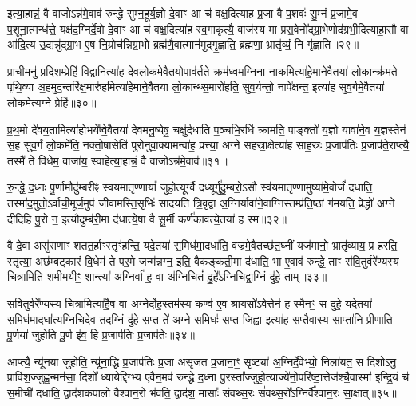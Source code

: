 इत्या॒हान्नं॒ वै वाजो\-ऽन्न॑मे॒वाव॑ रुन्द्धे सुम्न॒हूर्य॒ज्ञो दे॒वाꣳ आ च॑ वक्ष॒दित्या॑ह प्र॒जा वै प॒शवः॑ सु॒म्नं प्र॒जामे॒व प॒शूना॒त्मन्ध॑त्ते॒ यक्ष॑द॒ग्निर्दे॒वो दे॒वाꣳ आ च॑ वक्ष॒दित्या॑ह स्व॒गाकृ॑त्यै॒ वाज॑स्य मा प्रस॒वेनो᳚द्ग्रा॒भेणोद॑ग्रभी॒दित्या॑हा॒सौ वा आ॑दि॒त्य उ॒द्यन्नु॑द्ग्रा॒भ ए॒ष नि॒म्रोच॑न्निग्रा॒भो ब्रह्म॑णै॒वात्मान॑मुद्गृ॒ह्णाति॒ ब्रह्म॑णा॒ भ्रातृ॑व्यं॒ नि गृ॑ह्णाति॥२९॥

{\anuvakamend[{प्रा॒णैः पोषो᳚\-ऽप्र॒त्याग्नी᳚ध्रे॒ पति॑मे॒ष दश॑ च॥६॥}]}

प्राची॒मनु॑ प्र॒दिश॒म्प्रेहि॑ वि॒द्वानित्या॑ह देवलो॒कमे॒वैतयो॒पाव॑र्तते॒ क्रम॑ध्वम॒ग्निना॒ नाक॒मित्या॑हे॒माने॒वैतया॑ लो॒कान्क्र॑मते पृथि॒व्या अ॒हमुद॒न्तरि॑क्ष॒मारु॑ह॒मित्या॑हे॒माने॒वैतया॑ लो॒कान्थ्स॒मारो॑हति॒ सुव॒र्यन्तो॒ नापे᳚क्षन्त॒ इत्या॑ह सुव॒र्गमे॒वैतया॑ लो॒कमे॒त्यग्ने॒ प्रेहि॑॥३०॥

प्र॒थ॒मो दे॑वय॒तामित्या॑हो॒भये᳚ष्वे॒वैतया॑ देवमनु॒ष्येषु॒ चक्षु॑र्दधाति प॒ञ्चभि॒रधि॑ क्रामति॒ पाङ्क्तो॑ य॒ज्ञो यावा॑ने॒व य॒ज्ञस्तेन॑ स॒ह सु॑व॒र्गं लो॒कमे॑ति॒ नक्तो॒षासेति॑ पुरोनुवा॒क्या॑मन्वा॑ह॒ प्रत्त्या॒ अग्ने॑ सहस्रा॒क्षेत्या॑ह साह॒स्रः प्र॒जाप॑तिः प्र॒जाप॑ते॒राप्त्यै॒ तस्मै॑ ते विधेम॒ वाजा॑य॒ स्वाहेत्या॒हान्नं॒ वै वाजो\-ऽन्न॑मे॒वाव॑॥३१॥

रु॒न्द्धे॒ द॒ध्नः पू॒र्णामौदु॑म्बरीꣴ स्वयमातृ॒ण्णायां᳚ जुहो॒त्यूर्ग्वै दध्यूर्गु॑दु॒म्बरो॒\-ऽसौ स्व॑यमातृ॒ण्णामुष्या॑मे॒वोर्जं॑ दधाति॒ तस्मा॑द॒मुतो॒\-ऽर्वाची॒मूर्ज॒मुप॑ जीवामस्ति॒सृभिः॑ सादयति त्रि॒वृद्वा अ॒ग्निर्यावा॑ने॒वाग्निस्तम्प्र॑ति॒ष्ठां ग॑मयति॒ प्रेद्धो॑ अग्ने दीदिहि पु॒रो न॒ इत्यौदुम्ब॑री॒मा द॑धात्ये॒षा वै सू॒र्मी कर्ण॑कावत्ये॒तया॑ ह स्म॥३२॥

वै दे॒वा असु॑राणाꣳ शतत॒र्\mbox{}हाꣳस्तृꣳ॑हन्ति॒ यदे॒तया॑ स॒मिध॑मा॒दधा॑ति॒ वज्र॑मे॒वैतच्छ॑त॒घ्नीं यज॑मानो॒ भ्रातृ॑व्याय॒ प्र ह॑रति॒ स्तृत्या॒ अछ॑म्बट्कारं वि॒धेम॑ ते पर॒मे जन्म॑न्नग्न॒ इति॒ वैक॑ङ्कती॒मा द॑धाति॒ भा ए॒वाव॑ रुन्द्धे॒ ताꣳ स॑वि॒तुर्वरे᳚ण्यस्य चि॒त्रामिति॑ शमी॒मयी॒ꣳ॒ शान्त्या॑ अ॒ग्निर्वा॑ ह॒ वा अ॑ग्नि॒चितं॑ दु॒हे᳚\-ऽग्नि॒चिद्वा॒ग्निं दु॑हे॒ ताम्॥३३॥

स॒वि॒तुर्वरे᳚ण्यस्य चि॒त्रामित्या॑है॒ष वा अ॒ग्नेर्दोह॒स्तम॑स्य॒ कण्व॑ ए॒व श्रा॑य॒सो॑\-ऽवे॒त्तेन॑ ह स्मैन॒ꣳ॒ स दु॑हे॒ यदे॒तया॑ स॒मिध॑मा॒दधा᳚त्यग्नि॒चिदे॒व तद॒ग्निं दु॑हे स॒प्त ते॑ अग्ने स॒मिधः॑ स॒प्त जि॒ह्वा इत्या॑ह स॒प्तैवास्य॒ साप्ता॑नि प्रीणाति पू॒र्णया॑ जुहोति पू॒र्ण इ॑व॒ हि प्र॒जाप॑तिः प्र॒जाप॑तेः॥३४॥

आप्त्यै॒ न्यू॑नया जुहोति॒ न्यू॑ना॒द्धि प्र॒जाप॑तिः प्र॒जा असृ॑जत प्र॒जाना॒ꣳ॒ सृष्ट्या॑ अ॒ग्निर्दे॒वेभ्यो॒ निला॑यत॒ स दिशो\-ऽनु॒ प्रावि॑श॒ज्जुह्व॒न्मन॑सा॒ दिशो᳚ ध्यायेद्दि॒ग्भ्य ए॒वैन॒मव॑ रुन्द्धे द॒ध्ना पु॒रस्ता᳚ज्जुहो॒त्याज्ये॑नो॒परि॑ष्टा॒त्तेज॑श्चै॒वास्मा॑ इन्द्रि॒यं च॑ स॒मीची॑ दधाति॒ द्वाद॑शकपालो वैश्वान॒रो भ॑वति॒ द्वाद॑श॒ मासाः᳚ संवथ्स॒रः सं॑वथ्स॒रो᳚\-ऽग्निर्वै᳚श्वान॒रः सा॒क्षात्॥३५॥

